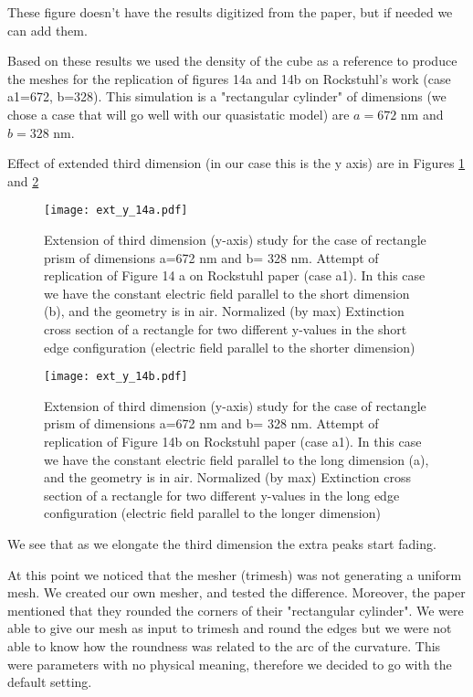 These figure doesn't have the results digitized from the paper, but if needed we can add them. 

Based on these results we used the density of the cube as a reference to produce the meshes for the replication 
of figures 14a and 14b on Rockstuhl's work (case a1=672, b=328). This simulation is a "rectangular cylinder" of 
dimensions (we chose a case that will go well with our quasistatic model) are $a=672$ nm and $b=328$ nm. 

Effect of extended third dimension (in our case this is the y axis) are in Figures \ref{fig:ext_y_14a} and
\ref{fig:ext_y_14b}

\begin{figure}
    \centering
    \texttt{[image: ext\_y\_14a.pdf]} 
    \caption{Extension of third dimension (y-axis) study for the case of rectangle prism of dimensions a=672 nm and b= 328 nm.
            Attempt of replication of Figure 14 a on Rockstuhl paper (case a1). In this case we have the constant 
            electric field parallel to the short dimension (b), and the geometry is in air. 
            Normalized (by max) Extinction cross section of a rectangle for two different y-values in the 
            short edge configuration (electric field parallel to the shorter dimension)}
    \label{fig:ext_y_14a}
 \end{figure}

 \begin{figure}
    \centering
    \texttt{[image: ext\_y\_14b.pdf]} 
    \caption{Extension of third dimension (y-axis) study for the case of rectangle prism of dimensions a=672 nm and b= 328 nm.
    Attempt of replication of Figure 14b on Rockstuhl paper (case a1). In this case we have the constant 
    electric field parallel to the long dimension (a), and the geometry is in air.
        Normalized (by max) Extinction cross section of a rectangle for two different y-values in the 
    long edge configuration (electric field parallel to the longer dimension)}
    \label{fig:ext_y_14b}
 \end{figure}

We see that as we elongate the third dimension the extra peaks start fading. 

At this point we noticed that the mesher (trimesh) was not generating a uniform mesh. We created our 
own mesher, and tested the difference. Moreover, the paper mentioned that they rounded the corners of their
"rectangular cylinder". We were able to give our mesh as input to trimesh and round the edges but we were not able 
to know how the roundness was related to the arc of the curvature. This were parameters with no physical meaning, 
therefore we decided to go with the default setting. 


